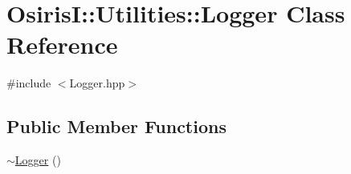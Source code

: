 \hypertarget{class_osiris_i_1_1_utilities_1_1_logger}{\section{Osiris\-I\-:\-:Utilities\-:\-:Logger Class Reference}
\label{class_osiris_i_1_1_utilities_1_1_logger}
}


{\ttfamily \#include $<$Logger.\-hpp$>$}

\subsection*{Public Member Functions}
\begin{DoxyCompactItemize}
\item 
\hyperlink{class_osiris_i_1_1_utilities_1_1_logger_ada8de0a215de7e90914a791f8d031700}{$\sim$\-Logger} ()
\end{DoxyCompactItemize}
